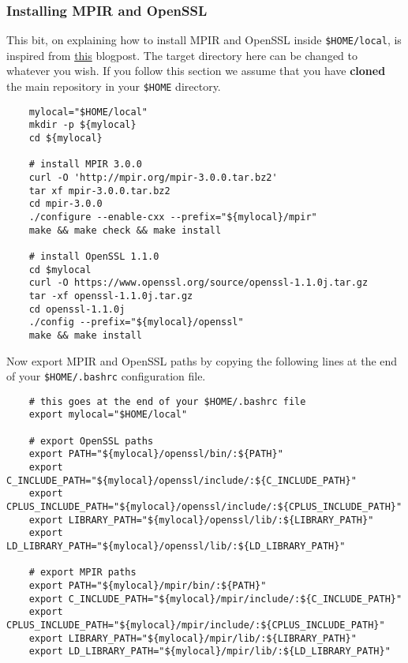 \subsubsection{Installing MPIR and OpenSSL}
This bit, on explaining how to install  MPIR and OpenSSL inside \verb+$HOME/local+, 
is inspired from \href{https://rdragos.github.io/2019/01/07/scale/}{this} blogpost.
The target directory here can be changed to whatever you wish.
If you follow this section we assume that you have \textbf{cloned}
the main repository in your \verb+$HOME+ directory.
\begin{verbatim}
    mylocal="$HOME/local"
    mkdir -p ${mylocal}
    cd ${mylocal}

    # install MPIR 3.0.0
    curl -O 'http://mpir.org/mpir-3.0.0.tar.bz2'
    tar xf mpir-3.0.0.tar.bz2
    cd mpir-3.0.0
    ./configure --enable-cxx --prefix="${mylocal}/mpir"
    make && make check && make install

    # install OpenSSL 1.1.0
    cd $mylocal
    curl -O https://www.openssl.org/source/openssl-1.1.0j.tar.gz
    tar -xf openssl-1.1.0j.tar.gz
    cd openssl-1.1.0j
    ./config --prefix="${mylocal}/openssl"
    make && make install
\end{verbatim}
Now export MPIR and OpenSSL paths by copying the following
lines at the end of your \verb+$HOME/.bashrc+ configuration file.
\begin{verbatim}
    # this goes at the end of your $HOME/.bashrc file
    export mylocal="$HOME/local"

    # export OpenSSL paths
    export PATH="${mylocal}/openssl/bin/:${PATH}"
    export C_INCLUDE_PATH="${mylocal}/openssl/include/:${C_INCLUDE_PATH}"
    export CPLUS_INCLUDE_PATH="${mylocal}/openssl/include/:${CPLUS_INCLUDE_PATH}"
    export LIBRARY_PATH="${mylocal}/openssl/lib/:${LIBRARY_PATH}"
    export LD_LIBRARY_PATH="${mylocal}/openssl/lib/:${LD_LIBRARY_PATH}"

    # export MPIR paths
    export PATH="${mylocal}/mpir/bin/:${PATH}"
    export C_INCLUDE_PATH="${mylocal}/mpir/include/:${C_INCLUDE_PATH}"
    export CPLUS_INCLUDE_PATH="${mylocal}/mpir/include/:${CPLUS_INCLUDE_PATH}"
    export LIBRARY_PATH="${mylocal}/mpir/lib/:${LIBRARY_PATH}"
    export LD_LIBRARY_PATH="${mylocal}/mpir/lib/:${LD_LIBRARY_PATH}"
\end{verbatim}

